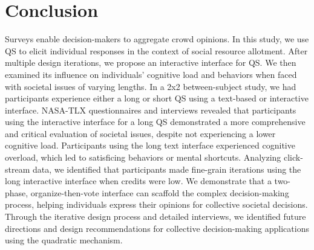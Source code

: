 \section{Conclusion}
Surveys enable decision-makers to aggregate crowd opinions. In this study, we use QS to elicit individual responses in the context of social resource allotment. After multiple design iterations, we propose an interactive interface for QS. We then examined its influence on individuals' cognitive load and behaviors when faced with societal issues of varying lengths. In a 2x2 between-subject study, we had participants experience either a long or short QS using a text-based or interactive interface. NASA-TLX questionnaires and interviews revealed that participants using the interactive interface for a long QS demonstrated a more comprehensive and critical evaluation of societal issues, despite not experiencing a lower cognitive load. Participants using the long text interface experienced cognitive overload, which led to satisficing behaviors or mental shortcuts. Analyzing click-stream data, we identified that participants made fine-grain iterations using the long interactive interface when credits were low. We demonstrate that a two-phase, organize-then-vote interface can scaffold the complex decision-making process, helping individuals express their opinions for collective societal decisions. Through the iterative design process and detailed interviews, we identified future directions and design recommendations for collective decision-making applications using the quadratic mechanism.